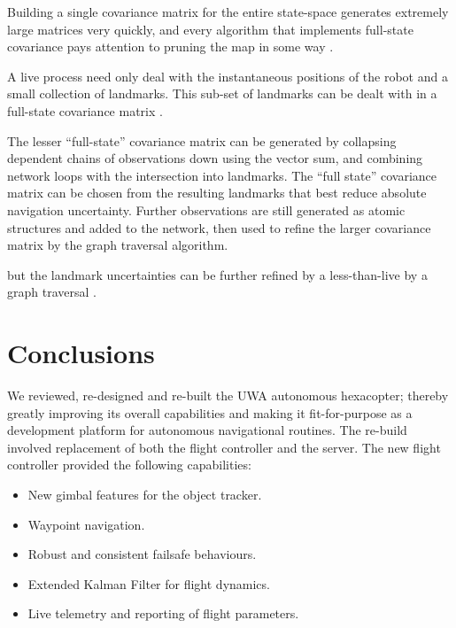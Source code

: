 \documentclass{article}
\begin{document}
        Building a single covariance matrix for the entire state-space generates extremely large matrices very quickly, and every algorithm that implements full-state covariance pays attention to pruning the map in some way\cite{monoslam} \cite{airshipSLAM}.
        
        A live process need only deal with the instantaneous positions of the robot and a small collection of landmarks. This sub-set of landmarks can be dealt with in a full-state covariance matrix \cite{monoslam}.  
        
        The lesser ``full-state'' covariance matrix can be generated by collapsing dependent chains of observations down using the vector sum, and combining network loops with the intersection into landmarks.  The ``full state'' covariance matrix can be chosen from the resulting landmarks that best reduce absolute navigation uncertainty.  Further observations are still generated as atomic structures and added to the network, then used to refine the larger covariance matrix by the graph traversal algorithm.  

        but the landmark uncertainties can be further refined by a less-than-live by a graph traversal \cite{SLAMgraph}.





\section{Conclusions}

We reviewed, re-designed and re-built the UWA autonomous hexacopter; thereby greatly improving its overall capabilities and making it fit-for-purpose as a development platform for autonomous navigational routines. The re-build involved replacement of both the flight controller and the server. The new flight controller provided the following capabilities:
\begin{itemize}
  \item New gimbal features for the object tracker.
  \item Waypoint navigation.
  \item Robust and consistent failsafe behaviours.
  \item Extended Kalman Filter for flight dynamics.
  \item Live telemetry and reporting of flight parameters.
\end{itemize}
\end{document}
